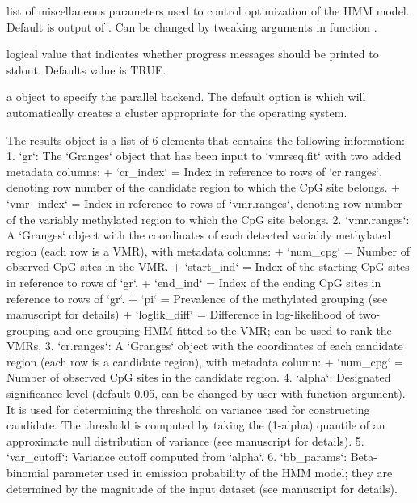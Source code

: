 \documentclass[letterpaper]{book}
\begin{document}
\begin{Arguments}
\begin{ldescription}
\item[\code{control}] list of miscellaneous parameters used to control optimization
of the HMM model. Default is output of .
Can be changed by tweaking arguments in function .

\item[\code{verbose}] logical value that indicates whether progress messages
should be printed to stdout. Defaults value is TRUE.

\item[\code{BPPARAM}] a  object to specify the parallel
backend. The default option is  which will
automatically creates a cluster appropriate for the operating system.
\end{ldescription}
\end{Arguments}
%
\begin{Value}
The results object is a list of 6 elements that contains the following information:
1. `gr`: The `Granges` object that has been input to `vmrseq.fit` with two added metadata columns:
+ `cr\_index` = Index in reference to rows of `cr.ranges`, denoting row number of the candidate region to which the CpG site belongs.
+ `vmr\_index` = Index in reference to rows of `vmr.ranges`, denoting row number of the variably methylated region to which the CpG site belongs.
2. `vmr.ranges`: A `Granges` object with the coordinates of each detected variably methylated region (each row is a VMR), with metadata columns:
+ `num\_cpg` = Number of observed CpG sites in the VMR.
+ `start\_ind` = Index of the starting CpG sites in reference to rows of `gr`.
+ `end\_ind` = Index of the ending CpG sites in reference to rows of `gr`.
+ `pi` = Prevalence of the methylated grouping (see manuscript for details)
+ `loglik\_diff` = Difference in log-likelihood of two-grouping and one-grouping HMM fitted to the VMR; can be used to rank the VMRs.
3. `cr.ranges`: A `Granges` object with the coordinates of each candidate region (each row is a candidate region), with metadata column:
+ `num\_cpg` = Number of observed CpG sites in the candidate region.
4. `alpha`: Designated significance level (default 0.05, can be changed by user with function argument). It is used for determining the threshold on variance used for constructing candidate. The threshold is computed by taking the (1-alpha) quantile of an approximate null distribution of variance (see manuscript for details).
5. `var\_cutoff`: Variance cutoff computed from `alpha`.
6. `bb\_params`: Beta-binomial parameter used in emission probability of the HMM model; they are determined by the magnitude of the input dataset (see manuscript for details).
\end{Value}
\end{document}
